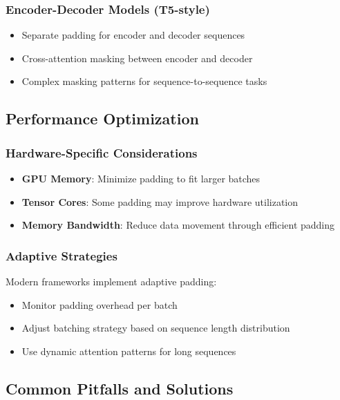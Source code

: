\subsubsection{Encoder-Decoder Models (T5-style)}
\begin{itemize}
\item Separate padding for encoder and decoder sequences
\item Cross-attention masking between encoder and decoder
\item Complex masking patterns for sequence-to-sequence tasks
\end{itemize}

\subsection{Performance Optimization}

\subsubsection{Hardware-Specific Considerations}
\begin{itemize}
\item \textbf{GPU Memory}: Minimize padding to fit larger batches
\item \textbf{Tensor Cores}: Some padding may improve hardware utilization
\item \textbf{Memory Bandwidth}: Reduce data movement through efficient padding
\end{itemize}

\subsubsection{Adaptive Strategies}
Modern frameworks implement adaptive padding:
\begin{itemize}
\item Monitor padding overhead per batch
\item Adjust batching strategy based on sequence length distribution
\item Use dynamic attention patterns for long sequences
\end{itemize}

\subsection{Common Pitfalls and Solutions}

